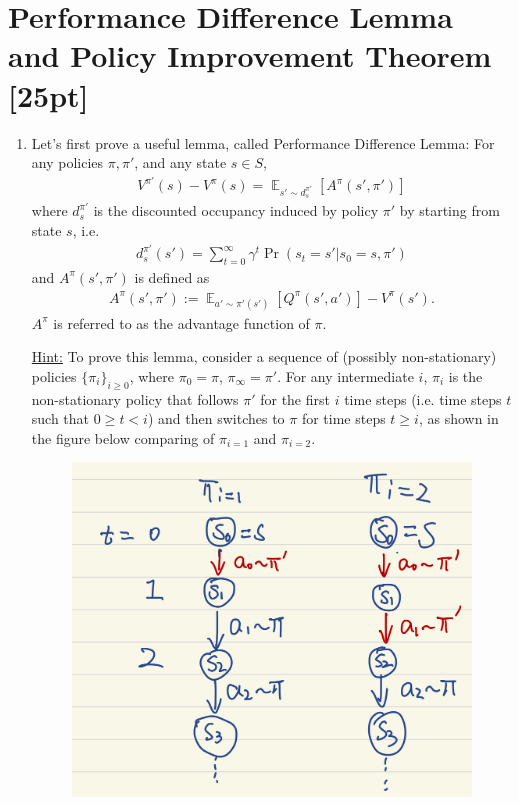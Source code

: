 \documentclass[11pt]{article}
\theoremstyle{case}
\DeclareMathOperator{\E}{\mathbb{E}}
\begin{document}
\section{Performance Difference Lemma and Policy Improvement Theorem [25pt]}
\begin{enumerate}[label=(\alph*)]
\item Let's first prove a useful lemma, called Performance Difference Lemma: For any policies $\pi, \pi'$, and any state $s\in S$,
\begin{align*}
    V^{\pi'}(s) - V^{\pi}(s) = \E_{s'\sim d^{\pi'}_s}[A^\pi(s',\pi')]
\end{align*}
where $d^{\pi'}_s$ is the discounted occupancy induced by policy $\pi'$ by starting from state $s$, i.e.
\begin{align*}
    d^{\pi'}_s(s') = \sum_{t=0}^\infty \gamma^t\Pr(s_t=s'|s_0=s, \pi')
\end{align*}
and $A^\pi(s',\pi')$ is defined as 
\begin{align*}
    A^\pi(s',\pi') := \E_{a'\sim\pi'(s')} [Q^\pi(s',a')] - V^\pi(s').
\end{align*}
$A^\pi$ is referred to as the advantage function of $\pi$.

\underline{Hint:}
To prove this lemma, consider a sequence of (possibly non-stationary) policies $\{\pi_i\}_{i\geq0}$, where $\pi_0=\pi$, $\pi_\infty=\pi'$. For any intermediate $i$, $\pi_i$ is the non-stationary policy that follows $\pi'$ for the first $i$ time steps (i.e. time steps $t$ such that $0 \geq t <i$) and then switches to $\pi$ for time steps $t\geq i$, as shown in the figure below comparing of $\pi_{i=1}$ and $\pi_{i=2}$.
\begin{figure}[h]
\includegraphics[scale=.7]{assignment1_2.png}
\centering
\end{figure}



\end{enumerate}
\end{document}
